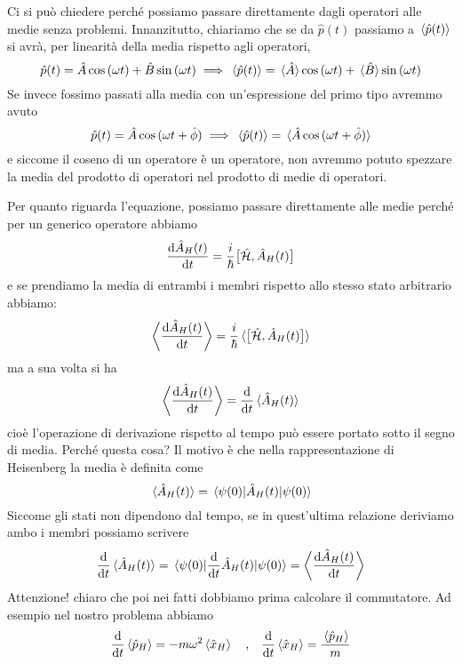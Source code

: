 \begin{soluzione}
   Ci si può chiedere perché possiamo passare direttamente dagli operatori alle medie senza problemi. Innanzitutto, chiariamo che se da $\hat{p}(t)$ passiamo a $\expval*{\hat{p}(t)}$ si avrà, per linearità della media rispetto agli operatori,
   \begin{equation*}
      \hat{p}(t)
      =\hat{A}\cos{(\omega t)} + \hat{B}\sin{(\omega t)}
      \implies
      \expval*{\hat{p}(t)}
      =\expval*{\hat{A}}\cos{(\omega t)} + \expval*{\hat{B}}\sin{(\omega t)}
   \end{equation*}
   Se invece fossimo passati alla media con un'espressione del primo tipo avremmo avuto
   \begin{equation*}
      \hat{p}(t)
      =\hat{A}\cos{(\omega t + \hat{\phi})}
      \implies
      \expval*{\hat{p}(t)}
      =\expval*{\hat{A}\cos{(\omega t + \hat{\phi})}}
   \end{equation*}
   e siccome il coseno di un operatore è un operatore, non avremmo potuto spezzare la media del prodotto di operatori nel prodotto di medie di operatori.
   
   Per quanto riguarda l'equazione, possiamo passare direttamente alle medie perché per un generico operatore abbiamo
   \begin{equation*}
      \dv{\hat{A}_H(t)}{t}
      =\frac{i}{\hbar} \big[ \hat{\mathcal{H}}, \hat{A}_H(t) \big]
   \end{equation*}
   e se prendiamo la media di entrambi i membri rispetto allo stesso stato arbitrario abbiamo:
   \begin{equation*}
      \bigg\langle \dv{\hat{A}_H(t)}{t} \bigg\rangle
      =\frac{i}{\hbar} \expval*{\big[ \hat{\mathcal{H}}, \hat{A}_H(t) \big]}
   \end{equation*}
   ma a sua volta si ha
   \begin{equation*}
      \bigg\langle \dv{\hat{A}_H(t)}{t} \bigg\rangle
      =\dv{t} \expval*{\hat{A}_H(t)}
   \end{equation*}
   cioè l'operazione di derivazione rispetto al tempo può essere portato sotto il segno di media. Perché questa cosa? Il motivo è che nella rappresentazione di Heisenberg la media è definita come
   \begin{equation*}
      \expval*{\hat{A}_H(t)}=\mel*{\psi(0)}{\hat{A}_H(t)}{\psi(0)}
   \end{equation*}
   Siccome gli stati non dipendono dal tempo, se in quest'ultima relazione deriviamo ambo i membri possiamo scrivere
   \begin{equation*}
      \dv{t} \expval*{\hat{A}_H(t)}
      =\mel*{\psi(0)}{\dv{t} \hat{A}_H(t)}{\psi(0)}=\bigg\langle \dv{\hat{A}_H(t)}{t} \bigg\rangle
   \end{equation*}
      Attenzione! \E chiaro che poi nei fatti dobbiamo prima calcolare il commutatore. Ad esempio nel nostro problema abbiamo
   \begin{equation*}
      \dv{t} \expval*{\hat{p}_H}=-m\omega^2 \expval*{\hat{x}_H}
      \qqtext{,}
      \dv{t} \expval*{\hat{x}_H}=\frac{\expval*{\hat{p}_H}}{m}
   \end{equation*}
   

\end{soluzione}
